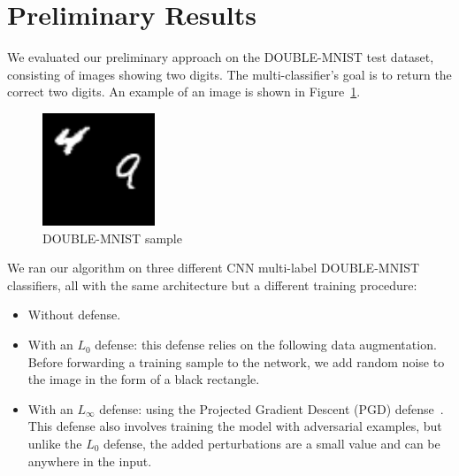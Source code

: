 
\section{Preliminary Results}
We evaluated our preliminary approach on the DOUBLE-MNIST test dataset, consisting of images showing two digits. The multi-classifier's goal is to return the correct two digits. %
An example of an image is shown in Figure~\ref{fig:double-mnist-sample}. %
\begin{figure}
    \centering
    \includegraphics[width=0.3\textwidth]{3.png}
    \caption{DOUBLE-MNIST sample}
    \label{fig:double-mnist-sample}
\end{figure}
We ran our algorithm on three different CNN multi-label DOUBLE-MNIST classifiers, all with the same architecture but a different training procedure:
\begin{itemize}
    \item Without defense. %
      \item With an $L_0$ defense: this defense relies on the following data augmentation.
    Before forwarding a training sample to the network, we add random noise to the image in the form of a black rectangle.
        \item With an $L_{\infty}$ defense: using the Projected Gradient Descent (PGD) defense~\cite{PGD}.
    This defense also involves training the model with adversarial examples, but unlike the $L_0$ defense, the added perturbations are a small value and can be anywhere in the input.
\end{itemize} 

